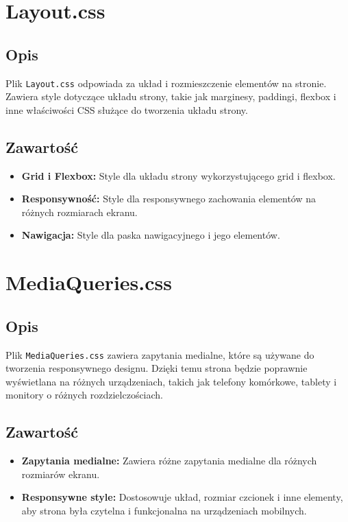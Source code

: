 \documentclass[12pt,a4paper]{report}
\begin{document}
\section{Layout.css}

\subsection{Opis}
Plik \texttt{Layout.css} odpowiada za układ i rozmieszczenie elementów na stronie. Zawiera style dotyczące układu strony, takie jak marginesy, paddingi, flexbox i inne właściwości CSS służące do tworzenia układu strony.

\subsection{Zawartość}
\begin{itemize}
    \item \textbf{Grid i Flexbox:} Style dla układu strony wykorzystującego grid i flexbox.
    \item \textbf{Responsywność:} Style dla responsywnego zachowania elementów na różnych rozmiarach ekranu.
    \item \textbf{Nawigacja:} Style dla paska nawigacyjnego i jego elementów.
\end{itemize}

\section{MediaQueries.css}

\subsection{Opis}
Plik \texttt{MediaQueries.css} zawiera zapytania medialne, które są używane do tworzenia responsywnego designu. Dzięki temu strona będzie poprawnie wyświetlana na różnych urządzeniach, takich jak telefony komórkowe, tablety i monitory o różnych rozdzielczościach.

\subsection{Zawartość}
\begin{itemize}
    \item \textbf{Zapytania medialne:} Zawiera różne zapytania medialne dla różnych rozmiarów ekranu.
    \item \textbf{Responsywne style:} Dostosowuje układ, rozmiar czcionek i inne elementy, aby strona była czytelna i funkcjonalna na urządzeniach mobilnych.
\end{itemize}
\end{document}

